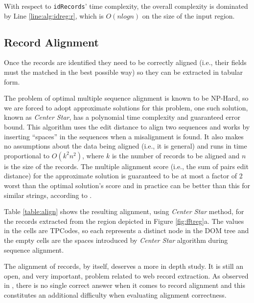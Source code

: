 With respect to \texttt{idRecords}' time complexity, the overall complexity is
dominated by Line \ref{line:alg:idreg:r}, which is $O(nlogn)$ on the size of the
input region.
\subsection{Record Alignment}\label{ss:reca}

Once the records are identified they need to be correctly aligned (i.e., their
fields must the matched in the best possible way) so they can be extracted in
tabular form.

The problem of optimal multiple sequence alignment is known to be
NP-Hard\cite{msanphard2006}, so we are forced to adopt approximate solutions for
this problem, one such solution, known as \textit{Center
Star}\cite{centerstar1993}, has a polynomial time complexity and guaranteed
error bound. This algorithm uses the edit distance to align two sequences and
works by inserting ``spaces'' in the sequences when a misalignment is found. It
also makes no assumptions about the data being aligned (i.e., it is general)
and runs in time proportional to $O(k^2n^2)$, where $k$ is the number of records to be
aligned and $n$ is the size of the records. The multiple alignment score (i.e.,
the sum of pairs edit distance) for the approximate solution is guaranteed to be
at most a factor of 2 worst than the optimal solution's score and in practice
can be better than this for similar strings, according to \cite{centerstar1993}.

Table \ref{table:align} shows the resulting alignment, using \textit{Center
Star} method, for the records extracted from the region depicted in Figure
\ref{fig:fftreg}a. The values in the cells are
TPCodes, so each represents a distinct node in the DOM tree and the empty
cells are the spaces introduced by \textit{Center Star} algorithm
during sequence alignment.

The alignment of records, by itself, deserves a more in depth study. It is still
an open, and very important, problem related to web record extraction. As
observed in \cite{listExtract2009}, there is no single correct answer when it
comes to record alignment and this constitutes an additional difficulty when
evaluating alignment correctness.

\vspace{-0.3cm}

